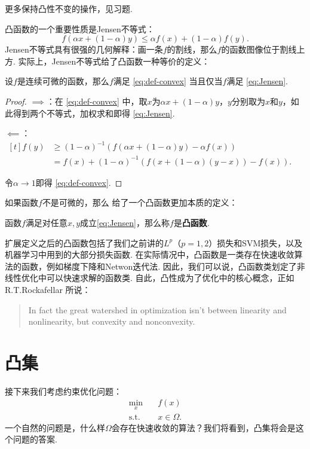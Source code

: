 更多保持凸性不变的操作，见习题. 

凸函数的一个重要性质是Jensen不等式：
\begin{equation}
    f(\alpha x+(1-\alpha) y)\leq \alpha f(x)+(1-\alpha) f(y). \label{eq:Jensen}
\end{equation}
Jensen不等式具有很强的几何解释：画一条$f$的割线，那么$f$的函数图像位于割线上方. 实际上，Jensen不等式给了凸函数一种等价的定义：

\begin{theorem}\label{thm:convex-equivalence}
    设$f$是连续可微的函数，那么$f$满足 \eqref{eq:def-convex} 当且仅当$f$满足 \eqref{eq:Jensen}.
\end{theorem}
\begin{proof}
    $\implies$：在 \eqref{eq:def-convex} 中，取$x$为$\alpha x+(1-\alpha) y$，$y$分别取为$x$和$y$，如此得到两个不等式，加权求和即得 \eqref{eq:Jensen}.

    $\impliedby$：$\begin{aligned}[t]
    f(y)&\geq(1-\alpha)^{-1}(f(\alpha x+(1-\alpha) y)-\alpha f(x))\\
    &=f(x)+(1-\alpha)^{-1}(f(x+(1-\alpha) (y-x))-f(x)).\end{aligned}$
    
    令$\alpha\to 1$即得 \eqref{eq:def-convex}.
\end{proof}

如果函数$f$不是可微的，那么 给了一个凸函数更加本质的定义：
\begin{definition}[凸函数]
    函数$f$满足对任意$x,y$成立\eqref{eq:Jensen}，那么称$f$是\textbf{凸函数}.
\end{definition}

扩展定义之后的凸函数包括了我们之前讲的$L^p$（$p=1,2$）损失和SVM损失，以及机器学习中用到的大部分损失函数. 在实际情况中，凸函数是一类存在快速收敛算法的函数，例如梯度下降和Netwon迭代法. 因此，我们可以说，凸函数类划定了非线性优化中可以快速求解的函数类. 自此，凸性成为了优化中的核心概念，正如R.T.Rockafellar \cite{???} 所说：

\begin{quotation}
\centering
In fact the great watershed in optimization isn't between linearity and nonlinearity, but convexity and nonconvexity.
\end{quotation}

\section{凸集}
接下来我们考虑约束优化问题：
\begin{align*}
    \min_x &\quad f(x)\\
    \text{s.t.}&\quad x\in \Omega.
\end{align*}
一个自然的问题是，什么样$\Omega$会存在快速收敛的算法？我们将看到，凸集将会是这个问题的答案.

